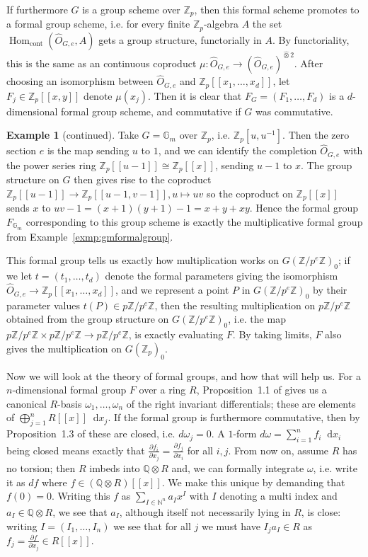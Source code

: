 \documentclass[12pt]{article}
\newcommand{\N}{\mathbb{N}}
\newcommand{\Z}{\mathbb{Z}}
\renewcommand{\G}{\mathbb{G}}
\newcommand{\Q}{\mathbb{Q}}
\newcommand*\diff{\mathop{}\!\mathrm{d}}
\newcommand{\tensor}{\otimes}
\DeclareMathOperator{\Hom}{Hom}
\theoremstyle{plain}
\theoremstyle{definition}
\newtheorem{exmp}[thm]{Example} %
\theoremstyle{remark}
\begin{document}
If furthermore $G$ is a group scheme over $\Z_p$, then this formal scheme promotes to a formal group scheme, i.e. for every finite $\Z_p$-algebra $A$ the set $\Hom_{\text{cont}}(\widehat{O}_{G,e},A)$ gets a group structure, functorially in $A$. By functoriality, this is the same as an continuous coproduct $\mu: \widehat{O}_{G,e} \to \left(\widehat{O}_{G,e}\right)^{\widehat{\tensor} 2}$. After choosing an isomorphism between $\widehat{O}_{G,e}$ and $\Z_p[[x_1,\dots,x_d]]$, let $F_j \in \Z_p[[x,y]]$ denote $\mu(x_j)$. Then it is clear that $F_G = (F_1,\dots,F_d)$ is a $d$-dimensional formal group scheme, and commutative if $G$ was commutative.
\addtocounter{thm}{-3}
\begin{exmp}[continued]
\label{exmp:gmtoformal}
Take $G = \G_m$ over $\Z_p$, i.e. $\Z_p[u,u^{-1}]$. Then the zero section $e$ is the map sending $u$ to $1$, and we can identify the completion $\widehat{O}_{G,e}$ with the power series ring $\Z_p[[u-1]] \cong \Z_p[[x]]$, sending $u-1$ to $x$. The group structure on $G$ then gives rise to the coproduct $\Z_p[[u-1]] \to \Z_p[[u-1,v-1]], u \mapsto uv$ so the coproduct on $\Z_p[[x]]$ sends $x$ to $uv-1 = (x+1)(y+1) -1 = x + y + xy$. Hence the formal group $F_{\G_m}$ corresponding to this group scheme is exactly the multiplicative formal group from Example~\ref{exmp:gmformalgroup}.
\end{exmp}

This formal group tells us exactly how multiplication works on $G(\Z/p^e\Z)_0$; if we let $t = (t_1,\dots,t_d)$ denote the formal parameters giving the isomorphism $\widehat{O}_{G,e} \to \Z_p[[x_1,\dots,x_d]]$, and we represent a point $P$ in $G(\Z/p^e\Z)_0$ by their parameter values $t(P) \in p\Z/p^e\Z$, then the resulting multiplication on $p\Z/p^e\Z$ obtained from the group structure on $G(\Z/p^e\Z)_0$, i.e. the map $p\Z/p^e\Z \times p\Z/p^e\Z \to p\Z/p^e\Z$, is exactly evaluating $F$. By taking limits, $F$ also gives the multiplication on $G(\Z_p)_0$.

Now we will look at the theory of formal groups, and how that will help us. For a $n$-dimensional formal group $F$ over a ring $R$, Proposition~1.1 of \cite{honda70} gives us a canonical $R$-basis $\omega_1,\dots,\omega_n$ of the right invariant differentials; these are elements of $\bigoplus_{j=1}^n R[[x]] \diff x_j$. If the formal group is furthermore commutative, then by Proposition~1.3 of \cite{honda70} these are closed, i.e. $d\omega_j = 0$. A $1$-form $d\omega = \sum_{i=1}^n f_i \diff x_i$ being closed means exactly that $\frac{\partial f_i}{\partial x_j} = \frac{\partial f_j}{\partial x_i}$ for all $i,j$. From now on, assume $R$ has no torsion; then $R$ imbeds into $\Q \tensor R$ and, we can formally integrate $\omega$, i.e. write it as $df$ where $f \in (\Q\tensor R)[[x]]$. We make this unique by demanding that $f(0) = 0$. Writing this $f$ as $\sum_{I \in \N^n} a_I x^I$ with $I$ denoting a multi index and $a_I \in \Q\tensor R$, we see that $a_I$, although itself not necessarily lying in $R$, is close: writing $I = (I_1,\dots,I_n)$ we see that for all $j$ we must have $I_j a_I \in R$ as $f_j = \frac{\partial f}{\partial x_j} \in R[[x]]$.
\end{document}
